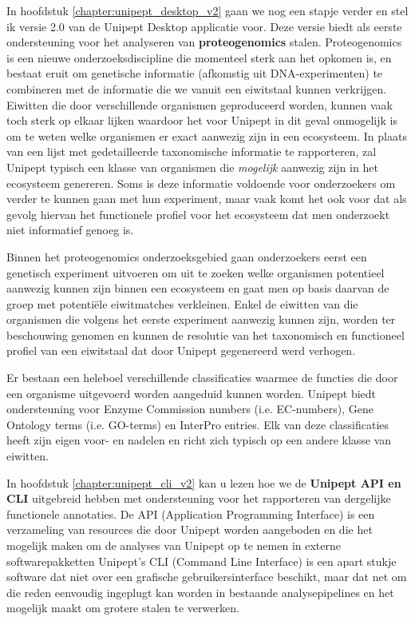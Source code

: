In hoofdstuk \ref{chapter:unipept_desktop_v2} gaan we nog een stapje verder en stel ik versie 2.0 van de Unipept Desktop applicatie voor.
Deze versie biedt als eerste ondersteuning voor het analyseren van \textbf{proteogenomics} stalen.
Proteogenomics is een nieuwe onderzoeksdiscipline die momenteel sterk aan het opkomen is, en bestaat eruit om genetische informatie (afkomstig uit DNA-experimenten) te combineren met de informatie die we vanuit een eiwitstaal kunnen verkrijgen.
Eiwitten die door verschillende organismen geproduceerd worden, kunnen vaak toch sterk op elkaar lijken waardoor het voor Unipept in dit geval onmogelijk is om te weten welke organismen er exact aanwezig zijn in een ecosysteem.
In plaats van een lijst met gedetailleerde taxonomische informatie te rapporteren, zal Unipept typisch een klasse van organismen die \textit{mogelijk} aanwezig zijn in het ecosysteem genereren.
Soms is deze informatie voldoende voor onderzoekers om verder te kunnen gaan met hun experiment, maar vaak komt het ook voor dat als gevolg hiervan het functionele profiel voor het ecosysteem dat men onderzoekt niet informatief genoeg is.

Binnen het proteogenomics onderzoeksgebied gaan onderzoekers eerst een genetisch experiment uitvoeren om uit te zoeken welke organismen potentieel aanwezig kunnen zijn binnen een ecosysteem en gaat men op basis daarvan de groep met potentiële eiwitmatches verkleinen.
Enkel de eiwitten van die organismen die volgens het eerste experiment aanwezig kunnen zijn, worden ter beschouwing genomen en kunnen de resolutie van het taxonomisch en functioneel profiel van een eiwitstaal dat door Unipept gegenereerd werd verhogen.

Er bestaan een heleboel verschillende classificaties waarmee de functies die door een organisme uitgevoerd worden aangeduid kunnen worden.
Unipept biedt ondersteuning voor Enzyme Commission numbers (i.e. EC-numbers), Gene Ontology terms (i.e. GO-terms) en InterPro entries.
Elk van deze classificaties heeft zijn eigen voor- en nadelen en richt zich typisch op een andere klasse van eiwitten.

In hoofdstuk \ref{chapter:unipept_cli_v2} kan u lezen hoe we de \textbf{Unipept API en CLI} uitgebreid hebben met ondersteuning voor het rapporteren van dergelijke functionele annotaties.
De API (Application Programming Interface) is een verzameling van resources die door Unipept worden aangeboden en die het mogelijk maken om de analyses van Unipept op te nemen in externe softwarepakketten
Unipept's CLI (Command Line Interface) is een apart stukje software dat niet over een grafische gebruikersinterface beschikt, maar dat net om die reden eenvoudig ingeplugt kan worden in bestaande analysepipelines en het mogelijk maakt om grotere stalen te verwerken.

